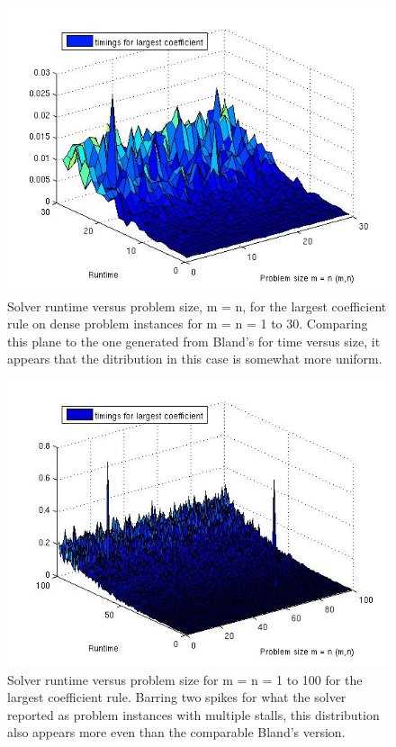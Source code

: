 \documentclass[9pt]{article}
\begin{document}
\begin{small}
\begin{figure}[tbp]
\centering
\includegraphics[scale=0.5]{m30lctimingversussize.jpg}
\caption{Solver runtime versus problem size, m = n, for the largest coefficient rule on dense problem instances for m = n = 1 to 30. Comparing this plane to the one generated from Bland's for time versus size, it appears that the ditribution in this case is somewhat more uniform.}
\end{figure}

\begin{figure}[tbp]
\centering
\includegraphics[scale=0.5]{m100lctimingversussize.jpg}
\caption{Solver runtime versus problem size for m = n = 1 to 100 for the largest coefficient rule. Barring two spikes for what the solver reported as problem instances with multiple stalls, this distribution also appears more even than the comparable Bland's version.}
\end{figure}
\end{small}
\end{document}
